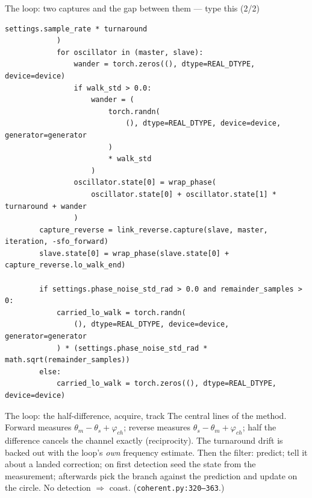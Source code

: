 \documentclass[10pt]{beamer}
\begin{document}
\begin{frame}[fragile]{The loop: two captures and the gap between them --- type this (2/2)}
\begin{lstlisting}[basicstyle=\ttfamily\tiny]
                settings.sample_rate * turnaround
            )
            for oscillator in (master, slave):
                wander = torch.zeros((), dtype=REAL_DTYPE, device=device)
                if walk_std > 0.0:
                    wander = (
                        torch.randn(
                            (), dtype=REAL_DTYPE, device=device, generator=generator
                        )
                        * walk_std
                    )
                oscillator.state[0] = wrap_phase(
                    oscillator.state[0] + oscillator.state[1] * turnaround + wander
                )
        capture_reverse = link_reverse.capture(slave, master, iteration, -sfo_forward)
        slave.state[0] = wrap_phase(slave.state[0] + capture_reverse.lo_walk_end)

        if settings.phase_noise_std_rad > 0.0 and remainder_samples > 0:
            carried_lo_walk = torch.randn(
                (), dtype=REAL_DTYPE, device=device, generator=generator
            ) * (settings.phase_noise_std_rad * math.sqrt(remainder_samples))
        else:
            carried_lo_walk = torch.zeros((), dtype=REAL_DTYPE, device=device)
\end{lstlisting}
\end{frame}

\begin{frame}{The loop: the half-difference, acquire, track}
  The central lines of the method. Forward measures
  $\theta_m-\theta_s+\varphi_{ch}$; reverse measures
  $\theta_s-\theta_m+\varphi_{ch}$; half the difference
  cancels the channel exactly (reciprocity). The turnaround
  drift is backed out with the loop's \emph{own} frequency
  estimate. Then the filter: predict; tell it about a landed
  correction; on first detection seed the state from the
  measurement; afterwards pick the branch against the
  prediction and update on the circle. No detection
  $\Rightarrow$ coast. (\texttt{coherent.py:320--363}.)
\end{frame}
\end{document}
